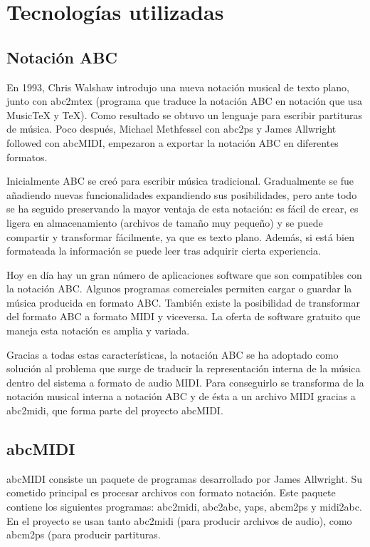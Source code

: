 \chapter{Tecnologías utilizadas}
\label{chap:techs}

\section{Notación ABC}
\label{sec:NotacionABC}

En 1993, Chris Walshaw introdujo una nueva notación musical de texto plano, junto con abc2mtex (programa que traduce la notación ABC en notación que usa MusicTeX y TeX). Como resultado se obtuvo un lenguaje para escribir partituras de música. Poco después, Michael Methfessel con abc2ps y James Allwright followed con abcMIDI, empezaron a exportar la notación ABC en diferentes formatos.

Inicialmente ABC se creó para escribir música tradicional. Gradualmente se fue añadiendo nuevas funcionalidades expandiendo sus posibilidades, pero ante todo se ha seguido preservando la mayor ventaja de esta notación: es fácil de crear, es ligera en almacenamiento (archivos de tamaño muy pequeño) y se puede compartir y transformar fácilmente, ya que es texto plano. Además, si está bien formateada la información se puede leer tras adquirir cierta experiencia.

Hoy en día hay un gran número de aplicaciones software que son compatibles con la notación ABC. Algunos programas comerciales permiten cargar o guardar la música producida en formato ABC. También existe la posibilidad de transformar del formato ABC a formato MIDI y viceversa. La oferta de software gratuito que maneja esta notación es amplia y variada. 

Gracias a todas estas características, la notación ABC se ha adoptado como solución al problema que surge de traducir la representación interna de la música dentro del sistema a formato de audio MIDI. Para conseguirlo se transforma de la notación musical interna a notación ABC y de ésta a un archivo MIDI gracias a abc2midi, que forma parte del proyecto abcMIDI.

\section{abcMIDI}
\label{sec:abcMIDI}

abcMIDI consiste un paquete de programas desarrollado por James Allwright. Su cometido principal es procesar archivos con formato notación. Este paquete contiene los siguientes programas: abc2midi, abc2abc, yaps, abcm2ps y midi2abc. En el proyecto se usan tanto abc2midi (para producir archivos de audio), como abcm2ps (para producir partituras.

